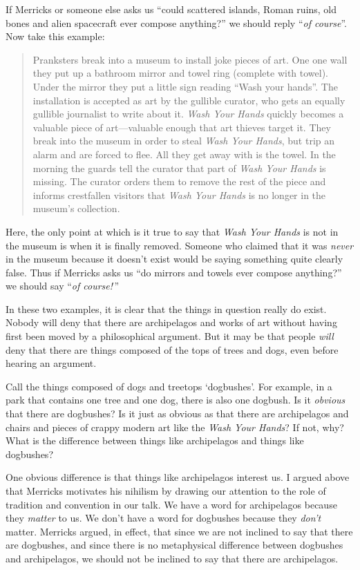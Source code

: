 \documentclass[11pt]{article}
\begin{document}
\begin{spacing}{1.25}
If Merricks or someone else asks us ``could scattered islands, Roman
ruins, old bones and alien spacecraft ever compose anything?'' we
should reply ``{\em of course}''.  Now take this example:

\begin{quote}
Pranksters break into a museum to install joke pieces of art.  One one
wall they put up a bathroom mirror and towel ring (complete with
towel).  Under the mirror they put a little sign reading ``Wash your
hands''.  The installation is accepted as art by the gullible curator,
who gets an equally gullible journalist to write about it.  {\em Wash
  Your Hands} quickly becomes a valuable piece of art---valuable
enough that art thieves target it.  They break into the museum in
order to steal {\em Wash Your Hands}, but trip an alarm and are forced
to flee.  All they get away with is the towel.  In the morning the
guards tell the curator that part of {\em Wash Your Hands} is missing.
The curator orders them to remove the rest of the piece and informs
crestfallen visitors that {\em Wash Your Hands} is no longer in the
museum's collection.
\end{quote}

Here, the only point at which is it true to say that {\em Wash Your
  Hands} is not in the museum is when it is finally removed.  Someone
who claimed that it was {\em never} in the museum because it doesn't
exist would be saying something quite clearly false.  Thus if Merricks
asks us ``do mirrors and towels ever compose anything?'' we should say
``{\em of course!}\,''

In these two examples, it is clear that the things in question really
do exist.  Nobody will deny that there are archipelagos and works of
art without having first been moved by a philosophical argument.  But
it may be that people {\em will} deny that there are things composed
of the tops of trees and dogs, even before hearing an argument.

Call the things composed of dogs and treetops `dogbushes'.  For
example, in a park that contains one tree and one dog, there is also
one dogbush.  Is it {\em obvious} that there are dogbushes?  Is it
just as obvious as that there are archipelagos and chairs and pieces
of crappy modern art like the {\em Wash Your Hands}?  If not, why?
What is the difference between things like archipelagos and things
like dogbushes?

One obvious difference is that things like archipelagos interest us.
I argued above that Merricks motivates his nihilism by drawing our
attention to the role of tradition and convention in our talk.  We
have a word for archipelagos because they {\em matter} to us.  We
don't have a word for dogbushes because they {\em don't} matter.
Merricks argued, in effect, that since we are not inclined to say that
there are dogbushes, and since there is no metaphysical difference
between dogbushes and archipelagos, we should not be inclined to say
that there are archipelagos.


\end{spacing}
\end{document}
